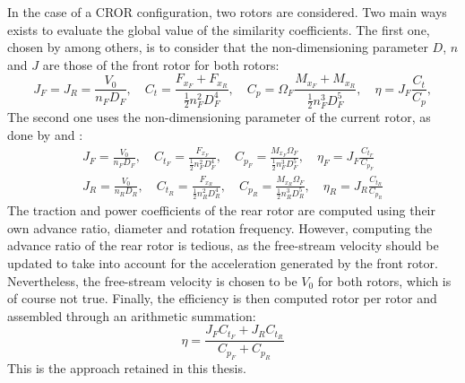 In the case of a CROR configuration, two rotors are considered.
Two main ways exists to evaluate the global value of the
similarity coefficients. The first one, chosen by
\citet{Bechet2011} among others, is to consider
that the non-dimensioning parameter $D$, $n$ and $J$ are those
of the front rotor for both rotors:
\begin{equation}
    J_F = J_R = \frac{V_0}{n_F D_F}, \quad
    C_t = \frac{F_{x_F} + F_{x_R}}{\frac{1}{2} n_F ^ 2  D_F ^ 4}, \quad
    C_p = \Omega_F \frac{M_{x_F} + M_{x_R}}{\frac{1}{2} n_F ^ 3 D_F ^ 5}, \quad
    \eta = J_F \frac{C_t}{C_p},   
\end{equation} 
The second one uses the non-dimensioning parameter of the current rotor,
as done by \citet{Stuermer2008} and \citet{Zachariadis2011}:
\begin{equation}
    \begin{split}
        J_F = \frac{V_0}{n_F D_F}, \quad
        C_{t_F} = \frac{F_{x_F}}{\frac{1}{2} n_F ^ 2  D_F ^ 4}, \quad
        C_{p_F} = \frac{M_{x_F}\Omega_F}{\frac{1}{2} n_F ^ 3 D_F ^ 5}, \quad
        \eta_F = J_F \frac{C_{t_F}}{C_{p_F}} \\
        J_R = \frac{V_0}{n_R D_R}, \quad
        C_{t_R} = \frac{F_{x_R}}{\frac{1}{2} n_R ^ 2  D_R ^ 4}, \quad
        C_{p_R} = \frac{M_{x_R}\Omega_F}{\frac{1}{2} n_R ^ 3 D_R ^ 5}, \quad
        \eta_R = J_R \frac{C_{t_R}}{C_{p_R}}
    \end{split}
\end{equation} 
The traction and power coefficients of the rear rotor are
computed using their own advance ratio, diameter and rotation frequency.
However, computing the advance ratio of the rear rotor is tedious, as
the free-stream velocity should be updated to take into account
for the acceleration generated by the front rotor. Nevertheless, the free-stream
velocity is chosen to be $V_0$ for both rotors, which is of course not true.
Finally, the efficiency is then computed rotor per rotor and
assembled through an arithmetic summation:
\begin{equation}
    \eta = \frac{J_F C_{t_F} + J_R C_{t_R}}{C_{p_F} + C_{p_R}}
\end{equation}
This is the approach retained in this thesis.
